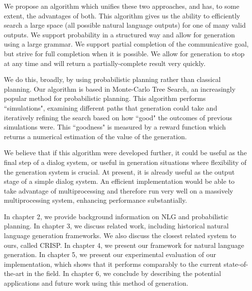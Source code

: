 We propose an algorithm which unifies these two approaches, and has, to some extent,
the advantages of both.  This algorithm gives
us the ability to efficiently search a large space (all possible natural language outputs) for 
one of many valid outputs.  We support probability in a structured way and allow
for generation using a large grammar.  We support partial completion of the communicative
goal, but strive for full completion when it is possible.  We allow for generation to stop
at any time and will return a partially-complete result very quickly.

We do this, broadly, by using probabilistic planning rather than classical planning.
Our algorithm is based in Monte-Carlo Tree Search, an increasingly
popular method for probabilistic planning.  This algorithm performs ``simulations",
examining different paths that generation could take and iteratively refining
the search based on how ``good" the outcomes of previous simulations were.
This ``goodness" is measured by a reward function which returns a numerical
estimation of the value of the generation.

We believe that if this algorithm were developed further, it could be useful as the
final step of a dialog system, or useful in generation situations where flexibility of the
generation system is crucial.  At present, it is already useful as the output stage of
a simple dialog system.  An efficient implementation would be able to take advantage
of multiprocessing and therefore run very well on a massively multiprocessing system,
enhancing performance substantially.

In chapter 2, we provide background information on NLG and probabilistic planning.  In chapter 3,
we discuss related work, including historical natural language generation frameworks.  We also
discuss the closest related system to ours, called CRISP.  In chapter 4, we present our framework
for natural language generation.  In chapter 5, we present our experimental evaluation of
our implementation, which shows that it performs comparably to the current state-of-the-art in
the field.  In chapter 6, we conclude by describing the potential applications and future work
using this method of generation.